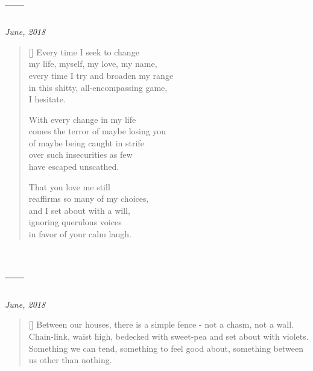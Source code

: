 \section{---}

\hfill\textit{June, 2018}

\begin{verse}[\textwidth]
  Every time I seek to change\\
  my life, myself, my love, my name,\\
  every time I try and broaden my range\\
  in this shitty, all-encompassing game,\\
  I hesitate.

  With every change in my life\\
  comes the terror of maybe losing you\\
  of maybe being caught in strife\\
  over such insecurities as few\\
  have escaped unscathed.

  That you love me still\\
  reaffirms so many of my choices,\\
  and I set about with a will,\\
  ignoring querulous voices\\
  in favor of your calm laugh.
\end{verse}
\newpage

\section{---}

\hfill\textit{June, 2018}

\begin{verse}[\textwidth]
  Between our houses,
  there is a simple fence -
  not a chasm, not a wall.
  Chain-link, waist high,
  bedecked with sweet-pea
  and set about with violets.
  Something we can tend,
  something to feel good about,
  something between us
  other than nothing.
\end{verse}
